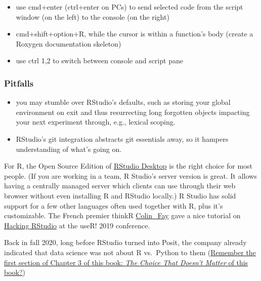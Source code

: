 \documentclass[
  12pt,
  letterpaper,
]{krantz}
\providecommand{\tightlist}{%
  \setlength{\itemsep}{0pt}\setlength{\parskip}{0pt}}\usepackage{longtable,booktabs,array}
\begin{document}
\begin{itemize}
\item
  use cmd+enter (ctrl+enter on PCs) to send selected code from the
  script window (on the left) to the console (on the right)
\item
  cmd+shift+option+R, while the cursor is within a function's body
  (create a Roxygen documentation skeleton)
\item
  use ctrl 1,2 to switch between console and script pane
\end{itemize}

\hypertarget{pitfalls}{%
\subsubsection*{Pitfalls}\label{pitfalls}}

\begin{itemize}
\tightlist
\item
  you may stumble over RStudio's defaults, such as storing your global
  environment on exit and thus resurrecting long forgotten objects
  impacting your next experiment through, e.g., lexical
  scoping.
\item
  RStudio's git integration abstracts git essentials away, so it hampers
  understanding of what's going on.
\end{itemize}

For R, the Open Source Edition of
\href{https://rstudio.com/products/rstudio/}{RStudio Desktop} is the
right choice for most people. (If you are working in a team, R Studio's
server version is great. It allows having a centrally managed server
which clients can use through their web browser without even installing
R and RStudio locally.) R Studio has solid support for a few other
languages often used together with R, plus it's customizable. The French
premier thinkR \href{https://x.com/_colinfay}{Colin\_Fay} gave a nice
tutorial on
\href{https://speakerdeck.com/colinfay/hacking-rstudio-advanced-use-of-your-favorite-ide}{Hacking
RStudio} at the useR! 2019 conference.

Back in fall 2020, long before RStudio turned into Posit, the company
already indicated that data science was not about R vs.~Python to them
(\href{/programming.html\#the-choice-that-doesnt-matter}{Remember the
first section of Chapter 3 of this book: \emph{The Choice That Doesn't
Matter} of this book?})
\end{document}
